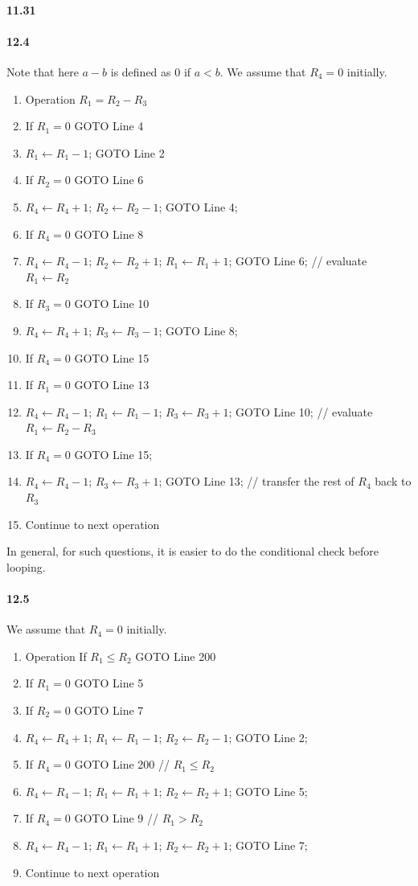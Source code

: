 \documentclass{article}
\begin{document}
\paragraph{11.31}


\paragraph{12.4}
Note that here $a-b$ is defined as $0$ if $a<b$. We assume that $R_4=0$ initially.
\begin{enumerate}
	\item Operation $R_1 = R_2 - R_3$
	\item If $R_1=0$ GOTO Line 4
	\item $R_1\gets R_1 - 1$; GOTO Line 2
	\item If $R_2=0$ GOTO Line 6
	\item $R_4\gets R_4 + 1$; $R_2\gets R_2 - 1$; GOTO Line 4;
	\item If $R_4=0$ GOTO Line 8
	\item $R_4\gets R_4 - 1$; $R_2\gets R_2 + 1$; $R_1\gets R_1 + 1$; GOTO Line 6; // evaluate $R_1\gets R_2$
	\item If $R_3=0$ GOTO Line 10
	\item $R_4\gets R_4 + 1$; $R_3\gets R_3 - 1$; GOTO Line 8;
	\item If $R_4=0$ GOTO Line 15
	\item If $R_1=0$ GOTO Line 13
	\item $R_4\gets R_4 - 1$; $R_1\gets R_1 - 1$; $R_3\gets R_3 + 1$; GOTO Line 10; // evaluate $R_1\gets R_2 - R_3$
	\item If $R_4=0$ GOTO Line 15;
	\item $R_4\gets R_4 - 1$; $R_3\gets R_3 + 1$; GOTO Line 13; // transfer the rest of $R_4$ back to $R_3$
	\item Continue to next operation
\end{enumerate}
In general, for such questions, it is easier to do the conditional check before looping.

\paragraph{12.5}
We assume that $R_4=0$ initially.
\begin{enumerate}
	\item Operation If $R_1\leq R_2$ GOTO Line 200
	\item If $R_1=0$ GOTO Line 5
	\item If $R_2=0$ GOTO Line 7
	\item $R_4\gets R_4 + 1$; $R_1\gets R_1 - 1$; $R_2\gets R_2 - 1$; GOTO Line 2;
	\item If $R_4=0$ GOTO Line 200 // $R_1\leq R_2$
	\item $R_4\gets R_4 - 1$; $R_1\gets R_1 + 1$; $R_2\gets R_2 + 1$; GOTO Line 5;
	\item If $R_4=0$ GOTO Line 9 // $R_1 > R_2$
	\item $R_4\gets R_4 - 1$; $R_1\gets R_1 + 1$; $R_2\gets R_2 + 1$; GOTO Line 7;
	\item Continue to next operation
\end{enumerate}
\end{document}
